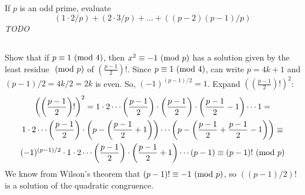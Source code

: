 \documentclass{article} \usepackage{amsmath}
\begin{document}
\subsection{}
If $p$ is an odd prime, evaluate
\begin{equation*}
    (1 \cdot 2/p) + (2 \cdot 3/p) + ... + ((p - 2)(p - 1)/p)
\end{equation*}
\textit{TODO}

\subsection{}
Show that if $p \equiv 1 \ (\mathrm{mod}\ 4)$, then $x^2 \equiv -1 \ (\mathrm{mod}\ p)$ has a solution given
by the least residue $\ (\mathrm{mod}\ p)$ of $(\frac{p - 1}{2})!$.
Since $p \equiv 1 \ (\mathrm{mod}\ 4)$, can write $p = 4k + 1$ and $(p - 1)/2 = 4k/2 = 2k$ is even.
So, $(-1)^{(p-1)/2} = 1$. Expand $((\frac{p - 1}{2})!)^2$:
\begin{gather*}
    \left(\left(\frac{p-1}{2}\right)!\right)^2 =
    1 \cdot 2 \cdots \left(\frac{p-1}{2}\right) \cdot
    \left(\frac{p-1}{2}\right) \cdot \left(\frac{p-1}{2} - 1\right)
    \cdots 1 =\\
    1 \cdot 2 \cdots \left(\frac{p-1}{2}\right) \cdot
    \left(p - \left(\frac{p-1}{2} + 1\right)\right) \cdots
    \left(p - \left(\frac{p-1}{2} + \frac{p-1}{2} - 1\right)\right) \equiv\\
    (-1)^{(p-1)/2} \cdot 1 \cdot 2 \cdots \left(\frac{p-1}{2}\right) \cdot
    \left(\frac{p-1}{2} + 1\right) \cdots (p - 1) \equiv (p - 1)! \ (\mathrm{mod}\ p)
\end{gather*}
We know from Wilson's theorem that $(p - 1)! \equiv -1 \ (\mathrm{mod}\ p)$,
so $((p-1)/2)!$ is a solution of the quadratic congruence.
\end{document}

